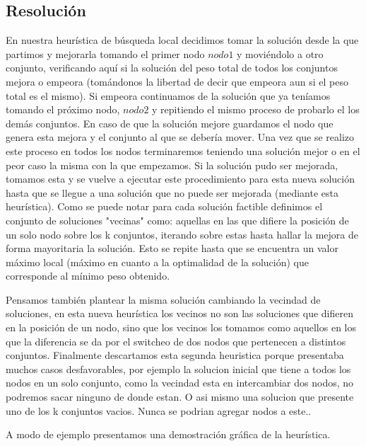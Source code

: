 \subsection{Resoluci\'on}

En nuestra heurística de búsqueda local decidimos tomar la solución desde la que partimos y mejorarla tomando el primer nodo $nodo1$ y moviéndolo a otro conjunto, verificando aquí si la solución del peso total de todos los conjuntos mejora o empeora (tomándonos la libertad de decir que empeora aun si el peso total es el mismo). Si empeora continuamos de la solución que ya teníamos tomando el próximo nodo, $nodo2$ y repitiendo el mismo proceso de probarlo el los demás conjuntos. En caso de que la solución mejore guardamos el nodo que genera esta mejora y el conjunto al que se debería mover. Una vez que se realizo este proceso en todos los nodos terminaremos teniendo una solución mejor o en el peor caso la misma con la que empezamos.
Si la solución pudo ser mejorada, tomamos esta y se vuelve a ejecutar este procedimiento para esta nueva solución hasta que se llegue a una solución que no puede ser mejorada (mediante esta heurística).
Como se puede notar para cada solución factible definimos el conjunto de soluciones "vecinas" como: aquellas en las que difiere la posición de un solo nodo sobre los k conjuntos, iterando sobre estas hasta hallar la mejora de forma mayoritaria la solución. Esto se repite hasta que se encuentra un valor máximo local (máximo en cuanto a la optimalidad de la solución) que corresponde al mínimo peso obtenido.

Pensamos también plantear la misma solución cambiando la vecindad de soluciones, en esta nueva heurística los vecinos no son las soluciones que difieren en la posición de un nodo, sino que los vecinos los tomamos como aquellos en los que la diferencia se da por el switcheo de dos nodos que pertenecen a distintos conjuntos.
Finalmente descartamos esta segunda heuristica porque presentaba muchos casos desfavorables, por ejemplo la solucion inicial que tiene a todos los nodos en un solo conjunto, como la vecindad esta en intercambiar dos nodos, no podremos sacar ninguno de donde estan. O asi mismo una solucion que presente uno de los k conjuntos vacios. Nunca se podrian agregar nodos a este..

A modo de ejemplo presentamos una demostración gráfica de la heurística.


